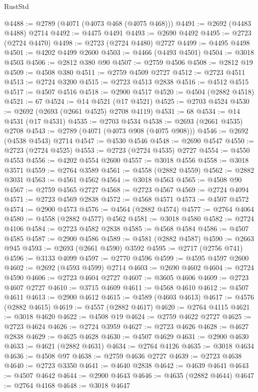 \begin{lexlean}{RustStd}
\begin{coremodule}
@4488 := @2789 (@4071 (@4073 @468 (@4075 @468)))
@4491 := @2692 (@4483 @4488) @2714
@4492 := @4475 @4491
@4493 := @2690 @4492
@4495 := @2723 (@2724 @4470)
@4498 := @2723 (@2724 @4480) @2727
@4499 := @4495 @4498
@4501 := @4202 @4499 @2600
@4503 := @4466 (@4493 @4501)
@4504 := @3018 @4503
@4506 := @2812 @380 @90
@4507 := @2759 @4506
@4508 := @2812 @19
@4509 := @4508 @380
@4511 := @2759 @4509 @2727
@4512 := @2723 @4511
@4513 := @2724 @3200
@4515 := @2723 @4513 @2838
@4516 := @4512 @4515
@4517 := @4507 @4516
@4518 := @2900 @4517
@4520 := @4504 (@2882 @4518)
@4521 := 67
@4524 := @14 @4521 (@17 @4521)
@4525 := @2703 @4524
@4530 := @2692 (@2693 (@2661 @4525) @2708 @4119)
@4531 := 68
@4534 := @14 @4531 (@17 @4531)
@4535 := @2703 @4534
@4538 := @2693 (@2661 @4535) @2708
@4543 := @2789 (@4071 (@4073 @908 (@4075 @908)))
@4546 := @2692 (@4538 @4543) @2714
@4547 := @4530 @4546
@4548 := @2690 @4547
@4550 := @2723 (@2724 @4525)
@4553 := @2723 (@2724 @4535) @2727
@4554 := @4550 @4553
@4556 := @4202 @4554 @2600
@4557 := @3018 @4556
@4558 := @3018 @3571
@4559 := @2764 @3589
@4561 := @4558 (@2882 @4559)
@4562 := @2882 @3031
@4563 := @4561 @4562
@4564 := @3018 @4563
@4565 := @4508 @90
@4567 := @2759 @4565 @2727
@4568 := @2723 @4567
@4569 := @2724 @4094
@4571 := @2723 @4569 @2838
@4572 := @4568 @4571
@4573 := @4507 @4572
@4574 := @2900 @4573
@4576 := @4564 (@2882 @4574)
@4577 := @2764 @4064
@4580 := @4558 (@2882 @4577) @4562
@4581 := @3018 @4580
@4582 := @2724 @4106
@4584 := @2723 @4582 @2838
@4585 := @4568 @4584
@4586 := @4507 @4585
@4587 := @2900 @4586
@4589 := @4581 (@2882 @4587)
@4590 := @2663 @945
@4593 := @2693 (@2661 @4590) @3592
@4595 := @2717 (@2756 @741)
@4596 := @3133 @4099
@4597 := @2770 @4596
@4599 := @4595 @4597 @2600
@4602 := @2692 (@4593 @4599) @2714
@4603 := @2690 @4602
@4604 := @2724 @4590
@4606 := @2723 @4604 @2727
@4607 := @3605 @4606
@4609 := @2723 @4607 @2727
@4610 := @3715 @4609
@4611 := @4568 @4610
@4612 := @4507 @4611
@4613 := @2900 @4612
@4615 := @4589 (@4603 @4613)
@4617 := @4576 (@2882 @4615)
@4619 := @4557 (@2882 @4617)
@4620 := @2764 @4115
@4621 := @3018 @4620
@4622 := @4508 @19
@4624 := @2759 @4622 @2727
@4625 := @2723 @4624
@4626 := @2724 @3959
@4627 := @2723 @4626
@4628 := @4627 @2838
@4629 := @4625 @4628
@4630 := @4507 @4629
@4631 := @2900 @4630
@4633 := @4621 (@2882 @4631)
@4634 := @2764 @4126
@4635 := @3018 @4634
@4636 := @4508 @97
@4638 := @2759 @4636 @2727
@4639 := @2723 @4638
@4640 := @2723 @3350
@4641 := @4640 @2838
@4642 := @4639 @4641
@4643 := @4507 @4642
@4644 := @2900 @4643
@4646 := @4635 (@2882 @4644)
@4647 := @2764 @4168
@4648 := @3018 @4647

\end{coremodule}
\end{lexlean}
